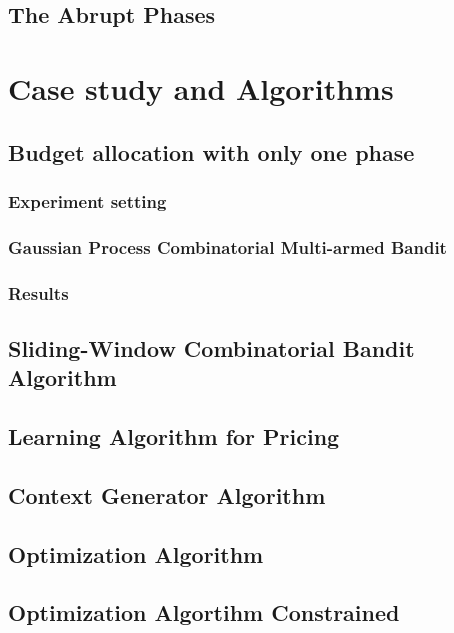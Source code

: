 \documentclass[12pt]{article}
\begin{document}
	\subsection{The Abrupt Phases}
	
	\section{Case study and Algorithms}
	\subsection{Budget allocation with only one phase}
	
	\subsubsection{Experiment setting}
	
	\subsubsection{Gaussian Process Combinatorial Multi-armed Bandit}
	
	\subsubsection{Results}
	
	
	\subsection{Sliding-Window Combinatorial Bandit Algorithm}
	\subsection{Learning Algorithm for Pricing}
	
	\subsection{Context Generator Algorithm}
	\subsection{Optimization Algorithm}
	\subsection{Optimization Algortihm Constrained}
	
\end{document}
